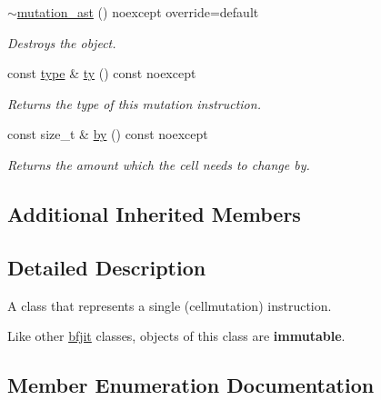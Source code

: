 \begin{DoxyCompactItemize}
\hyperlink{classbfjit_1_1mutation__ast_ae92ede7339103c1552ce76a4578c6bf7}{$\sim$mutation\+\_\+ast} () noexcept override=default
\begin{DoxyCompactList}\small\item\em Destroys the object. \end{DoxyCompactList}\item 
\hypertarget{classbfjit_1_1mutation__ast_a8f80ac1d17d4c77c1e5032f970e15e8e}{}\label{classbfjit_1_1mutation__ast_a8f80ac1d17d4c77c1e5032f970e15e8e} 
const \hyperlink{classbfjit_1_1mutation__ast_a4a35ab616dab7944deedac4300f473e9}{type} \& \hyperlink{classbfjit_1_1mutation__ast_a8f80ac1d17d4c77c1e5032f970e15e8e}{ty} () const noexcept
\begin{DoxyCompactList}\small\item\em Returns the type of this mutation instruction. \end{DoxyCompactList}\item 
\hypertarget{classbfjit_1_1mutation__ast_a2ee0d76e3a8aabee083952aea21035a5}{}\label{classbfjit_1_1mutation__ast_a2ee0d76e3a8aabee083952aea21035a5} 
const size\+\_\+t \& \hyperlink{classbfjit_1_1mutation__ast_a2ee0d76e3a8aabee083952aea21035a5}{by} () const noexcept
\begin{DoxyCompactList}\small\item\em Returns the amount which the cell needs to change {\itshape by}. \end{DoxyCompactList}\end{DoxyCompactItemize}
\subsection*{Additional Inherited Members}


\subsection{Detailed Description}
A class that represents a single (cellmutation) instruction. 

Like other \hyperlink{namespacebfjit}{bfjit} classes, objects of this class are {\bfseries immutable}. 

\subsection{Member Enumeration Documentation}
\hypertarget{classbfjit_1_1mutation__ast_a4a35ab616dab7944deedac4300f473e9}{}\label{classbfjit_1_1mutation__ast_a4a35ab616dab7944deedac4300f473e9} 
